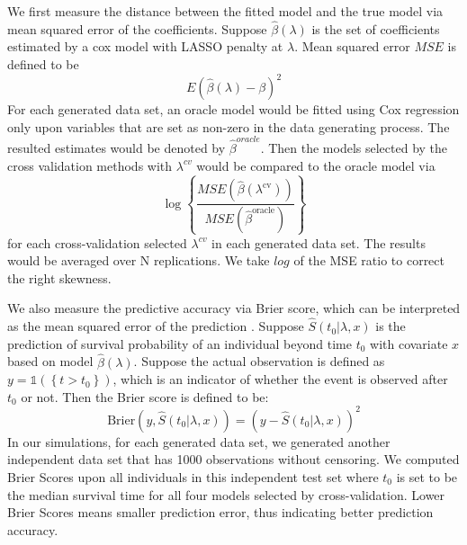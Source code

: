 \par We first measure the distance between the fitted model and the true model via mean squared error of the coefficients. Suppose $\hat{\beta}(\lambda)$ is the set of coefficients estimated by a cox model with LASSO penalty at $\lambda$. Mean squared error $MSE$ is defined to be 
\begin{equation}
E(\hat{\beta}(\lambda) - \beta)^2
\end{equation}
For each generated data set, an oracle model would be fitted using Cox regression only upon variables that are set as non-zero in the data generating process. The resulted estimates would be denoted by $\hat{\beta}^{oracle}$. Then the models selected by the cross validation methods with $\lambda^{cv}$ would be compared to the oracle model via 
\begin{equation}
\log\left\{ \frac{MSE(\hat{\beta}(\lambda^{\text{cv}}))}{MSE(\hat{\beta}^{\text{oracle}})} \right\}
\end{equation}
for each cross-validation selected $\lambda^{cv}$ in each generated data set. The results would be averaged over N replications. We take $log$ of the MSE ratio to correct the right skewness.


\par We also measure the predictive accuracy via Brier score, which can be interpreted as the mean squared error of the prediction \citep{VanHouwelingen2011}. Suppose $\hat{S}(t_0|\lambda,x)$ is the prediction of survival probability of an individual beyond time $t_0$ with covariate $x$ based on model $\hat{\beta}(\lambda)$. Suppose the actual observation is defined as $y = \mathbb{1}(\left\{ t > t_{0}\right\})$, which is an indicator of whether the event is observed after $t_0$ or not. Then the Brier score is defined to be:
\begin{equation}
	\text{Brier}(y, \hat{S}(t_0|\lambda,x)) = (y - \hat{S}(t_0|\lambda,x))^2
\end{equation}
In our simulations, for each generated data set, we generated another independent data set that has 1000 observations without censoring. We computed Brier Scores upon all individuals in this independent test set where $t_0$ is set to be the median survival time for all four models selected by cross-validation. Lower Brier Scores means smaller prediction error, thus indicating better prediction accuracy.

